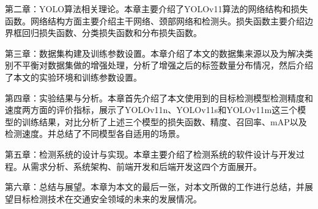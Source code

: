 第二章：YOLO算法相关理论。本章主要介绍了YOLOv11算法的网络结构和损失函数。网络结构方面主要介绍主干网络、颈部网络和检测头。损失函数主要介绍边界框回归损失函数、分类损失函数和分布损失函数。

第三章：数据集构建及训练参数设置。本章介绍了本文的数据集来源以及为解决类别不平衡对数据集做的增强处理，分析了增强之后的标签数量分布情况，然后介绍了本文的实验环境和训练参数设置。

第四章：实验结果与分析。本章首先介绍了本文使用到的目标检测模型检测精度和速度两方面的评价指标，展示了YOLOv11n、YOLOv11s和YOLOv11m这三个模型的训练结果，对比分析了上述三个模型的损失函数、精度、召回率、mAP以及检测速度。并总结了不同模型各自适用的场景。

第五章：检测系统的设计与实现。本章主要介绍了检测系统的软件设计与开发过程。从需求分析、系统架构、前端开发和后端开发这四个方面展开。

第六章：总结与展望。本章为本文的最后一张，对本文所做的工作进行总结，并展望目标检测技术在交通安全领域的未来的发展情况。
